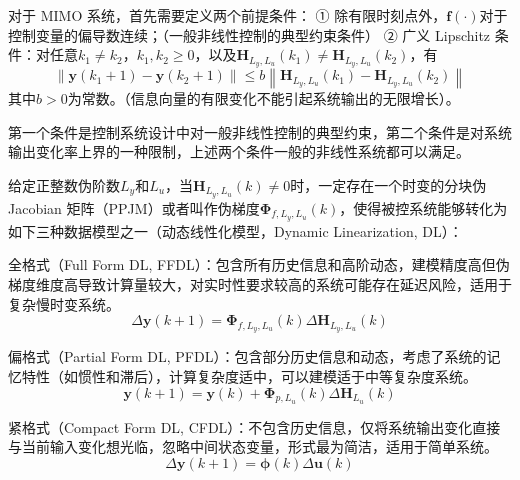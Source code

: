     对于 MIMO 系统，首先需要定义两个前提条件：
    ① 除有限时刻点外，$\boldsymbol{f}(\cdot)$对于控制变量的偏导数连续；（一般非线性控制的典型约束条件）
    ② 广义 Lipschitz 条件：对任意$k_1 \neq k_2$，$k_1,k_2 \geq 0$，以及$\boldsymbol{H}_{L_y,L_u}(k_1) \neq \boldsymbol{H}_{L_y,L_u}(k_2)$，有
    \begin{equation}
    \|\boldsymbol{y}(k_1 + 1) - \boldsymbol{y}(k_2 + 1)\| \leq b \left\| \boldsymbol{H}_{L_y,L_u}(k_1) - \boldsymbol{H}_{L_y,L_u}(k_2) \right\|
    \label{eq:general_lipschitz}
    \end{equation}
    其中$b > 0$为常数。（信息向量的有限变化不能引起系统输出的无限增长）\cite{houzhongsheng2011book_MFAC}。

    第一个条件是控制系统设计中对一般非线性控制的典型约束，第二个条件是对系统输出变化率上界的一种限制，上述两个条件一般的非线性系统都可以满足。

    给定正整数伪阶数$L_y$和$L_u$，当$\boldsymbol{H}_{L_y,L_u}(k) \neq 0$时，一定存在一个时变的分块伪 Jacobian 矩阵（PPJM）或者叫作伪梯度$\boldsymbol{\Phi}_{f,L_y,L_u}(k)$，使得被控系统能够转化为如下三种数据模型之一（动态线性化模型，Dynamic Linearization, DL）：

    全格式（Full Form DL, FFDL）：包含所有历史信息和高阶动态，建模精度高但伪梯度维度高导致计算量较大，对实时性要求较高的系统可能存在延迟风险，适用于复杂慢时变系统。
    \begin{equation}
    \Delta \boldsymbol{y}(k + 1) = \boldsymbol{\Phi}_{f,L_y,L_u}(k) \Delta \boldsymbol{H}_{L_y,L_u}(k)
    \label{eq:ffdl}
    \end{equation}

    偏格式（Partial Form DL, PFDL）：包含部分历史信息和动态，考虑了系统的记忆特性（如惯性和滞后），计算复杂度适中，可以建模适于中等复杂度系统。
    \begin{equation}
    \boldsymbol{y}(k + 1) = \boldsymbol{y}(k) + \boldsymbol{\Phi}_{p,L_u}(k) \Delta \boldsymbol{H}_{L_u}(k)
    \label{eq:pfdl}
    \end{equation}

    紧格式（Compact Form DL, CFDL）：不包含历史信息，仅将系统输出变化直接与当前输入变化想光临，忽略中间状态变量，形式最为简洁，适用于简单系统。
    \begin{equation}
    \Delta \boldsymbol{y}(k + 1) = \boldsymbol{\phi}(k) \Delta \boldsymbol{u}(k)
    \label{eq:cfdl}
    \end{equation}

